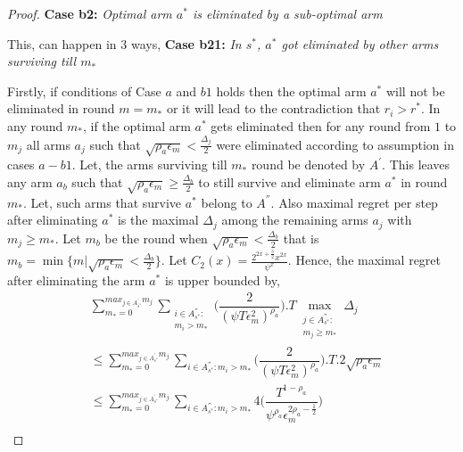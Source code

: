 \begin{proof}
 
\textbf{Case b2:} \textit{Optimal arm $a^{*}$ is eliminated by a sub-optimal arm}
  
	This, can happen in $3$ ways,
\newline
\textbf{Case b21:} \textit{In $s^{*}$, $a^{*}$ got eliminated by other arms surviving till $m_{*}$} 

Firstly, if conditions of  Case $a$ and $b1$ holds then the optimal arm $a^{*}$ will not be eliminated in round $m=m_{*}$ or it will lead to the contradiction that $r_{i}>r^{*}$. In any round $m_{*}$, if the optimal arm $a^{*}$ gets eliminated then for any round from $1$ to $m_{j}$ all arms $a_{j}$ such that $\sqrt{\rho_{a}\epsilon_{m}}<\frac{\Delta_{j}}{2}$ were eliminated according to assumption in cases $a-b1$. Let, the arms surviving till $m_{*}$ round be denoted by $A^{'}$. This leaves any arm $a_{b}$ such that $\sqrt{\rho_{a}\epsilon_{m}}\geq\frac{\Delta_{b}}{2}$ to still survive and eliminate arm $a^{*}$ in round $m_{*}$. Let, such arms that survive $a^{*}$ belong to $A^{''}$. Also maximal regret per step after eliminating $a^{*}$ is the maximal $\Delta_{j}$ among the remaining arms $a_{j}$ with $m_{j}\geq m_{*}$.  Let $m_{b}$ be the round when $\sqrt{\rho_{a}\epsilon_{m}}<\frac{\Delta_{b}}{2}$ that is $m_{b}=\min\lbrace m|\sqrt{\rho_{a}\epsilon_{m}}<\frac{\Delta_{b}}{2}\rbrace$. Let $C_2(x) = \frac{2^{2x+\frac{3}{2}}x^{2x}}{\psi^{x}}$. Hence, the maximal regret after eliminating the arm $a^{*}$ is upper bounded by, 
\begin{align*}
&\sum_{m_{*}=0}^{max_{j\in A^{'}_{s^{*}}}m_{j}}\sum_{\substack{i\in A^{''}_{s^{*}}: \\ m_{i}>m_{*}}}\bigg(\dfrac{2}{(\psi  T\epsilon_{m}^{2})^{\rho_{a}}} \bigg).T\max_{\substack{j\in A^{''}_{s^{*}}: \\ m_{j}\geq m_{*}}}{\Delta}_{j}\\
&\leq\sum_{m_{*}=0}^{max_{j\in A^{'}_{s^{*}}}m_{j}}\sum_{i\in A^{''}_{s^{*}}:m_{i}>m_{*}}\bigg(\dfrac{2}{(\psi  T\epsilon_{m}^{2})^{\rho_{a}}} \bigg).T.2\sqrt{\rho_{a}\epsilon_{m}} \\
&\leq\sum_{m_{*}=0}^{max_{j\in A^{'}_{s^{*}}}m_{j}}\sum_{i\in A^{''}_{s^{*}}:m_{i}>m_{*}}4\bigg(\dfrac{T^{1-\rho_{a}}}{\psi^{\rho_{a}}\epsilon_{m}^{2\rho_{a}-\frac{1}{2}}} \bigg)\\

\end{align*}
\end{proof}
